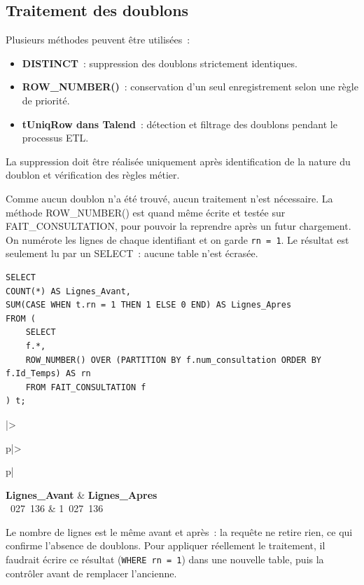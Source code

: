 \subsection{Traitement des doublons}

\noindent Plusieurs méthodes peuvent être utilisées~:
\begin{itemize}
	\item \textbf{DISTINCT}~: suppression des doublons strictement identiques.
	\item \textbf{ROW\_NUMBER()}~: conservation d'un seul enregistrement selon une règle de priorité.
	\item \textbf{tUniqRow dans Talend}~: détection et filtrage des doublons pendant le processus ETL.
\end{itemize}

\noindent La suppression doit être réalisée uniquement après identification de la nature du doublon et vérification des règles métier.

\noindent Comme aucun doublon n'a été trouvé, aucun traitement n'est nécessaire. La méthode ROW\_NUMBER() est quand même écrite et testée sur FAIT\_CONSULTATION, pour pouvoir la reprendre après un futur chargement. On numérote les lignes de chaque identifiant et on garde \texttt{rn = 1}. Le résultat est seulement lu par un SELECT~: aucune table n'est écrasée.

\begin{verbatim}
SELECT
COUNT(*) AS Lignes_Avant,
SUM(CASE WHEN t.rn = 1 THEN 1 ELSE 0 END) AS Lignes_Apres
FROM (
    SELECT
    f.*,
    ROW_NUMBER() OVER (PARTITION BY f.num_consultation ORDER BY f.Id_Temps) AS rn
    FROM FAIT_CONSULTATION f
) t;
\end{verbatim}
\begin{tableau}{|>{\raggedright\arraybackslash}p{\arrayrulewidth\relax}|>{\raggedright\arraybackslash}p{\arrayrulewidth\relax}|}
\textbf{Lignes\_\hspace{0pt}Avant} & \textbf{Lignes\_\hspace{0pt}Apres} \\ ~027~136 & 1~027~136 \\ \hline
\end{tableau}
\noindent Le nombre de lignes est le même avant et après~: la requête ne retire rien, ce qui confirme l'absence de doublons. Pour appliquer réellement le traitement, il faudrait écrire ce résultat (\texttt{WHERE rn = 1}) dans une nouvelle table, puis la contrôler avant de remplacer l'ancienne.


